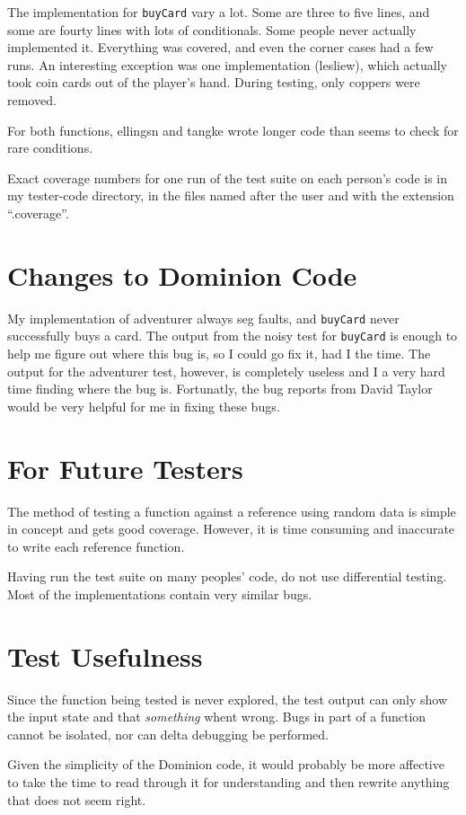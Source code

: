 \documentclass[letterpaper,12pt]{article}
\begin{document}
The implementation for {\tt buyCard} vary a lot. Some are three to five lines,
and some are fourty lines with lots of conditionals. Some people never actually
implemented it. Everything was covered, and even the corner cases had a few
runs. An interesting exception was one implementation (lesliew), which actually
took coin cards out of the player's hand. During testing, only coppers were
removed.

For both functions, ellingsn and tangke wrote longer code than seems to check
for rare conditions.

Exact coverage numbers for one run of the test suite on each person's code is
in my tester-code directory, in the files named after the user and with the
extension ``.coverage''.

\section{Changes to Dominion Code}
My implementation of adventurer always seg faults, and {\tt buyCard} never
successfully buys a card. The output from the noisy test for {\tt buyCard} is
enough to help me figure out where this bug is, so I could go fix it, had I the
time. The output for the adventurer test, however, is completely useless and I
a very hard time finding where the bug is. Fortunatly, the bug reports from
David Taylor would be very helpful for me in fixing these bugs.

\section{For Future Testers}
The method of testing a function against a reference using random data is
simple in concept and gets good coverage. However, it is time consuming and
inaccurate to write each reference function.

Having run the test suite on many peoples' code, do not use differential
testing. Most of the implementations contain very similar bugs.

\section{Test Usefulness}
Since the function being tested is never explored, the test output can only
show the input state and that \emph{something} whent wrong. Bugs in part of a
function cannot be isolated, nor can delta debugging be performed.

Given the simplicity of the Dominion code, it would probably be more affective
to take the time to read through it for understanding and then rewrite anything
that does not seem right.
\end{document}
